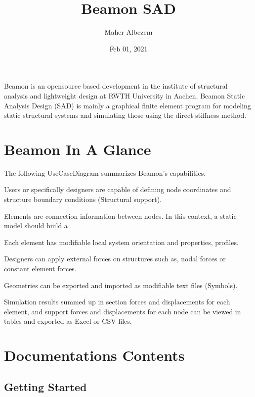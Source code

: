\documentclass[letterpaper,10pt,english]{sphinxmanual}
\title{Beamon SAD}
\date{Feb 01, 2021}
\author{Maher Albezem}
\begin{document}
\pagestyle{empty}
\sphinxmaketitle
\pagestyle{plain}
\sphinxtableofcontents
\pagestyle{normal}
\label{\detokenize{index::doc}}


Beamon is an open\sphinxhyphen{}source based development in the institute of structural analysis and
lightweight design at RWTH University in Aachen. Beamon Static Analysis Design (SAD) is mainly
a graphical finite element program for modeling static structural systems and simulating those using
the direct stiffness method.


\chapter{Beamon In A Glance}
\label{\detokenize{index:beamon-in-a-glance}}
The following Use\sphinxhyphen{}Case\sphinxhyphen{}Diagram summarizes Beamon’s capabilities.

\noindent{}

Users or specifically designers are capable of defining node coordinates and structure boundary conditions (Structural support).

Elements are connection information between nodes. In this context, a static model should build a
.

Each element has modifiable local system orientation and properties, profiles.

Designers can apply external forces on structures such as, nodal forces or constant element forces.

Geometries can be exported and imported as modifiable text files
(\sphinxhyphen{}Symbols).

Simulation results summed up in section forces and displacements for each element, and support forces and displacements
for each node can be viewed in tables and exported as Excel or CSV files.


\chapter{Documentations Contents}
\label{\detokenize{index:documentations-contents}}

\section{Getting Started}
\label{\detokenize{getting_started:getting-started}}\label{\detokenize{getting_started::doc}}
\end{document}
